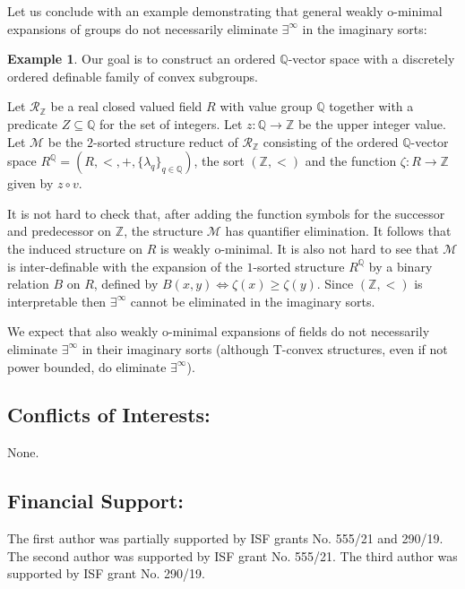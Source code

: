 \documentclass[11pt]{amsart}
\theoremstyle{definition}
\newtheorem{example}[theorem]{Example}
\newcommand{\Qq}{{\mathbb{Q}}}
\newcommand{\Zz}{{\mathbb {Z}}}
\newcommand{\CR}{{\mathcal R}}
\newcommand{\CM}{{\mathcal M}}
\newcommand{\0}{\emptyset}
\def\sub{\subseteq}
\begin{document}
Let us conclude with an example demonstrating that general weakly o-minimal expansions of groups do not necessarily eliminate $\exists^\infty$ in the  imaginary sorts: 
\begin{example}
    Our goal is to construct an ordered $\Qq$-vector space with a discretely ordered definable family   of  convex subgroups. 
    
    Let $\CR_\Zz$ be a real closed valued field $R$ with value group $\Qq$ together with a predicate $Z\sub \Qq$ for the set of integers. Let $z: \Qq\to \Zz$ be the upper integer value.  Let  $\CM$ be the $2$-sorted structure reduct of $\CR_\Zz$ consisting of the ordered  $\mathbb Q$-vector space $R^{\mathbb Q}=(R,<,+,\{\lambda_{q}\}_{q\in \mathbb Q})$, the sort $(\mathbb Z,<)$ and the function $\zeta: R\to \Zz$ given by $z\circ v$. 

    It is not hard to check that, after adding the function symbols for the successor and predecessor on $\Zz$, the structure $\CM$ has quantifier elimination. It follows that the induced structure on $R$ is weakly o-minimal. It is also not hard to see that $\CM$ is inter-definable with the expansion of the $1$-sorted structure  $R^{\mathbb Q}$ by a binary relation $B$ on $R$, defined by  $B(x,y) \Leftrightarrow \zeta(x)\geq \zeta(y)$. Since $(\mathbb Z,<)$ is interpretable then $\exists^\infty$ cannot be eliminated in the imaginary sorts.

\end{example}
    We expect that also weakly o-minimal expansions of fields do not necessarily eliminate $\exists^\infty$ in their imaginary sorts (although T-convex structures, even if not power bounded, do eliminate $\exists^\infty$).
    
     

\subsection*{Conflicts of Interests:} None.

\subsection*{Financial Support:} The first author was partially supported by ISF grants No. 555/21 and 290/19. The second author was supported by ISF grant No. 555/21. The third author was supported by ISF grant No. 290/19.



\end{document}
